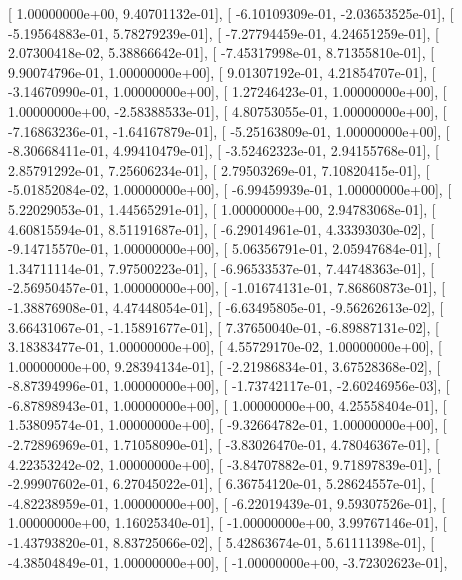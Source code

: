 \documentclass{article}
\begin{document}
       [  1.00000000e+00,   9.40701132e-01],
       [ -6.10109309e-01,  -2.03653525e-01],
       [ -5.19564883e-01,   5.78279239e-01],
       [ -7.27794459e-01,   4.24651259e-01],
       [  2.07300418e-02,   5.38866642e-01],
       [ -7.45317998e-01,   8.71355810e-01],
       [  9.90074796e-01,   1.00000000e+00],
       [  9.01307192e-01,   4.21854707e-01],
       [ -3.14670990e-01,   1.00000000e+00],
       [  1.27246423e-01,   1.00000000e+00],
       [  1.00000000e+00,  -2.58388533e-01],
       [  4.80753055e-01,   1.00000000e+00],
       [ -7.16863236e-01,  -1.64167879e-01],
       [ -5.25163809e-01,   1.00000000e+00],
       [ -8.30668411e-01,   4.99410479e-01],
       [ -3.52462323e-01,   2.94155768e-01],
       [  2.85791292e-01,   7.25606234e-01],
       [  2.79503269e-01,   7.10820415e-01],
       [ -5.01852084e-02,   1.00000000e+00],
       [ -6.99459939e-01,   1.00000000e+00],
       [  5.22029053e-01,   1.44565291e-01],
       [  1.00000000e+00,   2.94783068e-01],
       [  4.60815594e-01,   8.51191687e-01],
       [ -6.29014961e-01,   4.33393030e-02],
       [ -9.14715570e-01,   1.00000000e+00],
       [  5.06356791e-01,   2.05947684e-01],
       [  1.34711114e-01,   7.97500223e-01],
       [ -6.96533537e-01,   7.44748363e-01],
       [ -2.56950457e-01,   1.00000000e+00],
       [ -1.01674131e-01,   7.86860873e-01],
       [ -1.38876908e-01,   4.47448054e-01],
       [ -6.63495805e-01,  -9.56262613e-02],
       [  3.66431067e-01,  -1.15891677e-01],
       [  7.37650040e-01,  -6.89887131e-02],
       [  3.18383477e-01,   1.00000000e+00],
       [  4.55729170e-02,   1.00000000e+00],
       [  1.00000000e+00,   9.28394134e-01],
       [ -2.21986834e-01,   3.67528368e-02],
       [ -8.87394996e-01,   1.00000000e+00],
       [ -1.73742117e-01,  -2.60246956e-03],
       [ -6.87898943e-01,   1.00000000e+00],
       [  1.00000000e+00,   4.25558404e-01],
       [  1.53809574e-01,   1.00000000e+00],
       [ -9.32664782e-01,   1.00000000e+00],
       [ -2.72896969e-01,   1.71058090e-01],
       [ -3.83026470e-01,   4.78046367e-01],
       [  4.22353242e-02,   1.00000000e+00],
       [ -3.84707882e-01,   9.71897839e-01],
       [ -2.99907602e-01,   6.27045022e-01],
       [  6.36754120e-01,   5.28624557e-01],
       [ -4.82238959e-01,   1.00000000e+00],
       [ -6.22019439e-01,   9.59307526e-01],
       [  1.00000000e+00,   1.16025340e-01],
       [ -1.00000000e+00,   3.99767146e-01],
       [ -1.43793820e-01,   8.83725066e-02],
       [  5.42863674e-01,   5.61111398e-01],
       [ -4.38504849e-01,   1.00000000e+00],
       [ -1.00000000e+00,  -3.72302623e-01],
\end{document}
